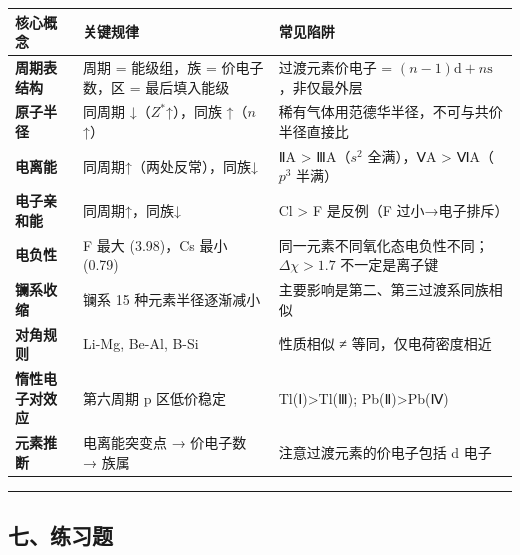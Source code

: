 \documentclass[a4paper,11pt]{ctexart}
\newcounter{none}
\begin{document}
{\def\LTcaptype{none} %
\begin{longtable}[]{@{}
  >{\raggedright\arraybackslash}p{}
  >{\raggedright\arraybackslash}p{}
  >{\raggedright\arraybackslash}p{}@{}}
\toprule\noalign{}
\begin{minipage}[b]{\linewidth}\raggedright
核心概念
\end{minipage} & \begin{minipage}[b]{\linewidth}\raggedright
关键规律
\end{minipage} & \begin{minipage}[b]{\linewidth}\raggedright
常见陷阱
\end{minipage} \\
\midrule\noalign{}
\endhead
\bottomrule\noalign{}
\endlastfoot
\textbf{周期表结构} & 周期 = 能级组，族 = 价电子数，区 = 最后填入能级 & 过渡元素价电子 = \((n-1)\mathrm{d} + n\mathrm{s}\)，非仅最外层 \\
\textbf{原子半径} & 同周期 ↓（\(Z^*\)↑），同族 ↑（\(n\)↑） & 稀有气体用范德华半径，不可与共价半径直接比 \\
\textbf{电离能} & 同周期↑（两处反常），同族↓ & ⅡA \textgreater{} ⅢA（\(s^2\) 全满），ⅤA \textgreater{} ⅥA（\(p^3\) 半满） \\
\textbf{电子亲和能} & 同周期↑，同族↓ & Cl \textgreater{} F 是反例（F 过小→电子排斥） \\
\textbf{电负性} & F 最大 (3.98)，Cs 最小 (0.79) & 同一元素不同氧化态电负性不同；\(\Delta\chi>1.7\) 不一定是离子键 \\
\textbf{镧系收缩} & 镧系 15 种元素半径逐渐减小 & 主要影响是第二、第三过渡系同族相似 \\
\textbf{对角规则} & Li-Mg, Be-Al, B-Si & 性质相似 ≠ 等同，仅电荷密度相近 \\
\textbf{惰性电子对效应} & 第六周期 p 区低价稳定 & Tl(Ⅰ)\textgreater Tl(Ⅲ); Pb(Ⅱ)\textgreater Pb(Ⅳ) \\
\textbf{元素推断} & 电离能突变点 → 价电子数 → 族属 & 注意过渡元素的价电子包括 d 电子 \\
\end{longtable}
}

\begin{center}\rule{0.5\linewidth}{0.5pt}\end{center}

\subsection{七、练习题}\label{ux4e03ux7ec3ux4e60ux9898}
\end{document}
